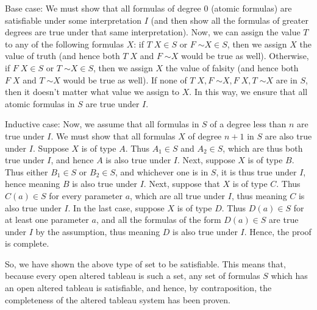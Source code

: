 \documentclass{article}
\newcommand*{\oldneg}{\mathord{\sim}}
\theoremstyle{definition}
\begin{document}
Base case: We must show that all formulas of degree 0 (atomic formulas) are satisfiable under some interpretation $I$ (and then show all the formulas of greater degrees are true under that same 
interpretation). Now, we can assign the value $T$ to any of the following formulas $X$: if $T\; X\in S$ or $F\;\oldneg X\in S$, then we assign $X$ the value of truth
(and hence both $T\; X$ and $F\;\oldneg X$ would be true as well). Otherwise, if $F\; X\in S$ or $T\;\oldneg X\in S$, then we assign $X$ the value of falsity (and hence both 
$F\; X$ and $T\;\oldneg X$ would be true as well). If none of $T\; X,F\;\oldneg X,F\; X,T\;\oldneg X$ are in $S$, then it doesn't matter what value we assign to $X$. 
In this way, we ensure that all atomic formulas in $S$ are true under $I$.

Inductive case: Now, we assume that all formulas in $S$ of a degree less than $n$ are true under $I$. We must show that all formulas $X$ of 
degree $n+1$ in $S$ are also true under $I$. Suppose
$X$ is of type $A$. Thus $A_1\in S$ and $A_2\in S$, which are thus both true under $I$, and hence $A$ is also true under $I$. Next, suppose $X$ is of type $B$.
 Thus either $B_1\in S$ or 
$B_2\in S$, and whichever one is in $S$, it is thus true under $I$, hence meaning $B$ is also true under $I$. Next, suppose that $X$ is of type $C$. 
Thus $C(a)\in S$ for every parameter $a$, which are 
all true under $I$, thus meaning $C$ is also true under $I$. In the last case, suppose $X$ is of type $D$. Thus $D(a)\in S$ for at least one parameter $a$, 
and all the formulas of the form $D(a)\in S$ are true 
under $I$ by the assumption, thus meaning $D$ is also true under $I$. Hence, the proof is complete.


So, we have shown the above type of set to be satisfiable. This means that, because every open altered tableau is such a set, any set of formulas $S$ which has an open altered tableau is 
satisfiable, and hence, by contraposition, the completeness of the altered tableau system has been proven.
\end{document}

